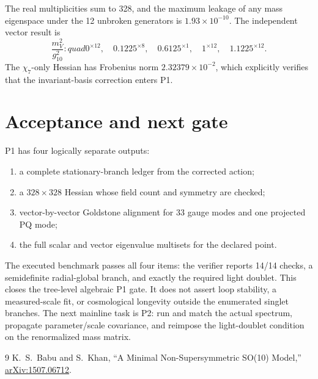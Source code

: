 \documentclass[11pt]{article}
\begin{document}
The real multiplicities sum to 328, and the maximum leakage of any mass
eigenspace under the 12 unbroken generators is $1.93\times10^{-10}$.
The independent vector result is
\begin{equation}
\frac{m_V^2}{g_{10}^2}:quad
0^{\times12},\quad0.1225^{\times8},\quad0.6125^{\times1},
\quad1^{\times12},\quad1.1225^{\times12}.
\end{equation}
The $\chi_7$-only Hessian has Frobenius norm $2.32379\times10^{-2}$, which
explicitly verifies that the invariant-basis correction enters P1.

\section{Acceptance and next gate}

P1 has four logically separate outputs:
\begin{enumerate}
\item a complete stationary-branch ledger from the corrected action;
\item a $328\times328$ Hessian whose field count and symmetry are checked;
\item vector-by-vector Goldstone alignment for 33 gauge modes and one
projected PQ mode;
\item the full scalar and vector eigenvalue multisets for the declared point.
\end{enumerate}
The executed benchmark passes all four items: the verifier reports 14/14
checks, a semidefinite radial-global branch, and exactly the required light
doublet.  This closes the tree-level algebraic P1 gate.  It does not assert
loop stability, a measured-scale fit, or cosmological longevity outside the
enumerated singlet branches.  The next mainline task is P2: run and match the
actual spectrum, propagate parameter/scale covariance, and reimpose the
light-doublet condition on the renormalized mass matrix.

\begin{thebibliography}{9}
K.~S.~Babu and S.~Khan,
``A Minimal Non-Supersymmetric SO(10) Model,''
\href{https://arxiv.org/abs/1507.06712}{arXiv:1507.06712}.
\end{thebibliography}
\end{document}
